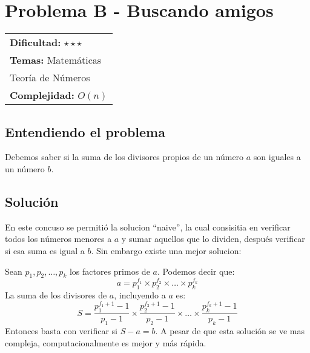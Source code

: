 \section{Problema B - Buscando amigos}

\hfill
\begin{tabular}{@{}l@{}}
\textbf{Dificultad:} $\star\star\star$ \\
\textbf{Temas:} Matemáticas \\
Teoría de Números \\
\textbf{Complejidad:} $O(n)$
\end{tabular}

\subsection*{Entendiendo el problema}
Debemos saber si la suma de los divisores propios de un número $a$ son iguales a un número $b$. 
\subsection*{Solución}
En este concuso se permitió la solucion ``naive'', la cual consisitia en verificar todos los números menores a $a$ y sumar aquellos que lo dividen, después verificar si esa suma es igual a $b$. Sin embargo existe una mejor solucion:

Sean $p_1, p_2, \ldots, p_k$ los factores primos de $a$. Podemos decir que: 
$$a=p_1^{f_1} \times p_2^{f_2} \times \ldots \times p_k^{f_k} $$
La suma de los divisores de $a$, incluyendo a $a$ es:
$$S=\frac{p_1^{f_1+1}-1}{p_1-1} \times \frac{p_2^{f_2+1}-1}{p_2-1} \times \ldots \times \frac{p_k^{f_k+1}-1}{p_k-1} $$
Entonces basta con verificar si $S-a=b$. A pesar de que esta solución se ve mas compleja, computacionalmente es mejor y más rápida.

